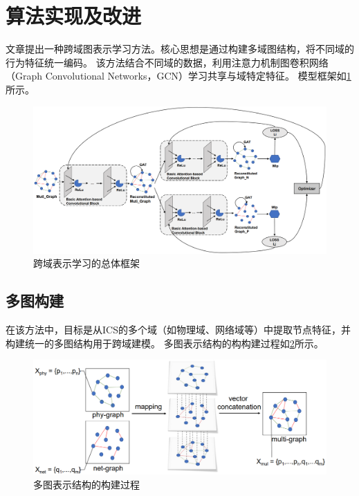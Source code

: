 \section{算法实现及改进}

文章提出一种跨域图表示学习方法。核心思想是通过构建多域图结构，将不同域的行为特征统一编码。
该方法结合不同域的数据，利用注意力机制图卷积网络（Graph Convolutional Networks，GCN）\cite{kipf2017semi}学习共享与域特定特征。
模型框架如\cref{figure:跨域表示学习的总体框架}所示。

\begin{figure}[ht]
    \centering
    \includegraphics[width=1\textwidth]{img/跨域表示学习的总体框架.png}
    \caption{跨域表示学习的总体框架}
    \label{figure:跨域表示学习的总体框架}
\end{figure}

\subsection{多图构建}

在该方法中，目标是从ICS的多个域（如物理域、网络域等）中提取节点特征，并构建统一的多图结构用于跨域建模。
多图表示结构的构构建过程如\cref{figure:多图表示结构的构建过程}所示。

\begin{figure}[ht]
    \centering
    \includegraphics[width=1\textwidth]{img/多图表示结构的构建过程.png}
    \caption{多图表示结构的构建过程}
    \label{figure:多图表示结构的构建过程}
\end{figure}

